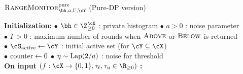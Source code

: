 \begin{algorithm}[t]
\caption{$\OutsideIntervalMonitor^{\mathrm{pure}}_{\bh, a, \Gamma, \cY}$ (Pure-DP version)}
\label{alg:outside-thresholds-pure-dp}

\textbf{Initialization:}
{\footnotesize $\bullet$ } $\bh \in \Z_{\ge 0}^{\cX}$ : private histogram \qquad \qquad
{\footnotesize $\bullet$ } $a > 0$ : noise parameter \\ 
{\footnotesize $\bullet$ } $\Gamma > 0$ : maximum number of rounds when $\textsc{Above}$ or $\textsc{Below}$ is returned\\
{\footnotesize $\bullet$ } $\Sactive \gets \cY$ : initial active set (for $\cY \subseteq \cX$)\\
{\footnotesize $\bullet$ } $\mbox{counter} \gets 0$ \qquad \qquad \qquad\qquad \qquad \qquad 
{\footnotesize $\bullet$ } $\eta \sim \operatorname{Lap}(2/a)$ : noise for threshold\\[-2mm]


\textbf{On input} $(f: \cX \to \{0, 1\}, \tau_{\ell},\tau_u\in\R_{\geq 0})$ {\bf :}\\[-2mm]



\Else{
    \Return $\Between$\;
}
\end{algorithm}




